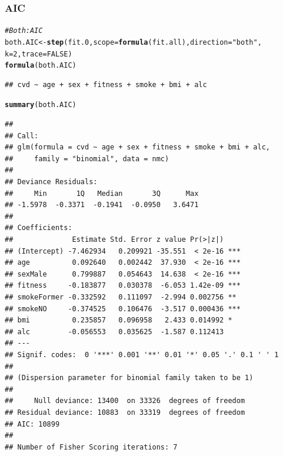 \documentclass{article}\usepackage[]{graphicx}\usepackage[]{xcolor}
\makeatletter
\newcommand{\hlnum}[1]{\textcolor[rgb]{0.686,0.059,0.569}{#1}}%
\newcommand{\hlstr}[1]{\textcolor[rgb]{0.192,0.494,0.8}{#1}}%
\newcommand{\hlcom}[1]{\textcolor[rgb]{0.678,0.584,0.686}{\textit{#1}}}%
\newcommand{\hlstd}[1]{\textcolor[rgb]{0.345,0.345,0.345}{#1}}%
\newcommand{\hlkwb}[1]{\textcolor[rgb]{0.69,0.353,0.396}{#1}}%
\newcommand{\hlkwc}[1]{\textcolor[rgb]{0.333,0.667,0.333}{#1}}%
\newcommand{\hlkwd}[1]{\textcolor[rgb]{0.737,0.353,0.396}{\textbf{#1}}}%
\newenvironment{kframe}{%
 \def\at@end@of@kframe{}%
 \ifinner\ifhmode%
  \def\at@end@of@kframe{\end{minipage}}%
  \begin{minipage}{\columnwidth}%
 \fi\fi%
 \def\FrameCommand##1{\hskip\@totalleftmargin \hskip-\fboxsep
 \colorbox{shadecolor}{##1}\hskip-\fboxsep
     \hskip-\linewidth \hskip-\@totalleftmargin \hskip\columnwidth}%
 \MakeFramed {\advance\hsize-\width
   \@totalleftmargin\z@ \linewidth\hsize
   \@setminipage}}%
 {\par\unskip\endMakeFramed%
 \at@end@of@kframe}
\newenvironment{knitrout}{}{} %
\makeatother
\begin{document}
      \subsubsection{AIC}
\begin{knitrout}
\color{fgcolor}\begin{kframe}
\begin{alltt}
\hlcom{#Both: AIC }
\hlstd{both.AIC} \hlkwb{<-} \hlkwd{step}\hlstd{(fit.0,} \hlkwc{scope}\hlstd{=}\hlkwd{formula}\hlstd{(fit.all),} \hlkwc{direction}\hlstd{=}\hlstr{"both"}\hlstd{,}
                 \hlkwc{k}\hlstd{=}\hlnum{2}\hlstd{,} \hlkwc{trace}\hlstd{=}\hlnum{FALSE}\hlstd{)}
\hlkwd{formula}\hlstd{(both.AIC)}
\end{alltt}
\begin{verbatim}
## cvd ~ age + sex + fitness + smoke + bmi + alc
\end{verbatim}
\begin{alltt}
\hlkwd{summary}\hlstd{(both.AIC)}
\end{alltt}
\begin{verbatim}
## 
## Call:
## glm(formula = cvd ~ age + sex + fitness + smoke + bmi + alc, 
##     family = "binomial", data = nmc)
## 
## Deviance Residuals: 
##     Min       1Q   Median       3Q      Max  
## -1.5978  -0.3371  -0.1941  -0.0950   3.6471  
## 
## Coefficients:
##              Estimate Std. Error z value Pr(>|z|)    
## (Intercept) -7.462934   0.209921 -35.551  < 2e-16 ***
## age          0.092640   0.002442  37.930  < 2e-16 ***
## sexMale      0.799887   0.054643  14.638  < 2e-16 ***
## fitness     -0.183877   0.030378  -6.053 1.42e-09 ***
## smokeFormer -0.332592   0.111097  -2.994 0.002756 ** 
## smokeNO     -0.374525   0.106476  -3.517 0.000436 ***
## bmi          0.235857   0.096958   2.433 0.014992 *  
## alc         -0.056553   0.035625  -1.587 0.112413    
## ---
## Signif. codes:  0 '***' 0.001 '**' 0.01 '*' 0.05 '.' 0.1 ' ' 1
## 
## (Dispersion parameter for binomial family taken to be 1)
## 
##     Null deviance: 13400  on 33326  degrees of freedom
## Residual deviance: 10883  on 33319  degrees of freedom
## AIC: 10899
## 
## Number of Fisher Scoring iterations: 7
\end{verbatim}
\end{kframe}
\end{knitrout}
      \clearpage
\end{document}
